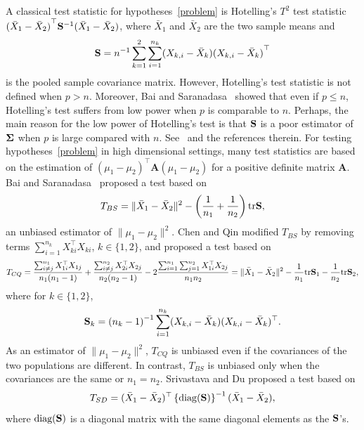 \documentclass[times,sort&compress,3p]{elsarticle}
\newcommand{\mytr}{ {\rm tr} }
\newcommand{\BA}{\mathbf{A}}    \newcommand{\BB}{\mathbf{B}}    \newcommand{\BC}{\mathbf{C}}    \newcommand{\BD}{\mathbf{D}}    \newcommand{\BE}{\mathbf{E}}    \newcommand{\BF}{\mathbf{F}}    \newcommand{\BG}{\mathbf{G}}    \newcommand{\BH}{\mathbf{H}}    \newcommand{\BI}{\mathbf{I}}    \newcommand{\BJ}{\mathbf{J}}    \newcommand{\BK}{\mathbf{K}}    \newcommand{\BL}{\mathbf{L}}
\theoremstyle{plain}
\theoremstyle{definition}
\theoremstyle{remark}
\begin{document}
A classical test statistic for hypotheses~\eqref{problem} is Hotelling's $T^2$ test  statistic ${(\bar{X}_1-\bar{X}_2)}^\top  \mathbf{S}^{-1}(\bar{X}_1-\bar{X}_2)$, where $\bar{X}_1$ and $\bar{X}_2$ are the two sample means and
\begin{equation*}
    \mathbf{S}=
n^{-1}\sum_{k=1}^2\sum_{i=1}^{n_k} (X_{k,i}-\bar{X}_k) {(X_{k,i}-\bar{X}_k)}^\top 
\end{equation*}
is the pooled sample covariance matrix.
However, Hotelling's test statistic is not defined when $p>n$.
Moreover, Bai and Saranadasa~\cite{Bai1996Efiect} showed that even if $p\leq n$, Hotelling's test suffers from low power when $p$ is comparable to $n$.
Perhaps, the main reason for the low power of Hotelling's test is that $\mathbf{S}$ is a poor estimator of $\boldsymbol{\Sigma}$ when $p$ is large compared with $n$.
See~\cite{Chen2010A} and the references therein.
For testing hypotheses~\eqref{problem} in high dimensional settings,  
many test statistics are based on the estimation of  ${(\mu_1-\mu_2)}^\top  \BA(\mu_1-\mu_2)$ for a positive definite matrix $\BA$. Bai and Saranadasa~\cite{Bai1996Efiect} proposed a test based on
\begin{equation*}
    T_{BS}=\|\bar{X}_1-\bar{X}_2\|^2-\left(\frac{1}{n_1}+\frac{1}{n_2}\right)\mytr \BS,
\end{equation*}
an unbiased estimator of $\|\mu_1-\mu_2\|^2$.
Chen and Qin \cite{Chen2010A} modified $T_{BS}$ by removing terms $\sum_{i=1}^{n_k}X_{ki}^\top  X_{ki}$, $k\in\{1,2\}$, and proposed a test based on
\begin{equation*}
        T_{CQ}=\frac{\sum_{i\neq j}^{n_1}X_{1i}^\top  X_{1j}}{n_1(n_1-1)}+\frac{\sum_{i\neq j}^{n_2}X_{2i}^\top  X_{2j}}{n_2(n_2-1)}-2\frac{\sum_{i=1}^{n_1}\sum_{j=1}^{n_2}X_{1i}^\top  X_{2j}}{n_1n_2}
            =\|\bar{X}_1-\bar{X}_2\|^2-\frac{1}{n_1}\mytr \BS_1-\frac{1}{n_2}\mytr \BS_2,
\end{equation*}
where for $ k\in\{1,2\}$,
\begin{equation*}
\mathbf{S}_k={(n_k -1)}^{-1}\sum_{i=1}^{n_k} (X_{k,i}-\bar{X}_k) (X_{k,i}-\bar{X}_k)^\top.
\end{equation*}
As an estimator of $\|\mu_1-\mu_2\|^2$, $T_{CQ}$ is unbiased even if the covariances of the two populations are different.
In contrast, $T_{BS}$ is unbiased only when the covariances are the same or $n_1=n_2$.
Srivastava and Du \cite{Srivastava2008A} proposed a test based on
\begin{equation*}
    T_{SD}=(\bar{X}_1-\bar{X}_2)^\top  \left\{\mathrm{diag}(\mathbf{S})\right\}^{-1}(\bar{X}_1-\bar{X}_2),
\end{equation*}
where $\textrm{diag} (\mathbf{S})$ is a diagonal matrix with the same diagonal elements as the $\mathbf{S}$'s.
\end{document}
